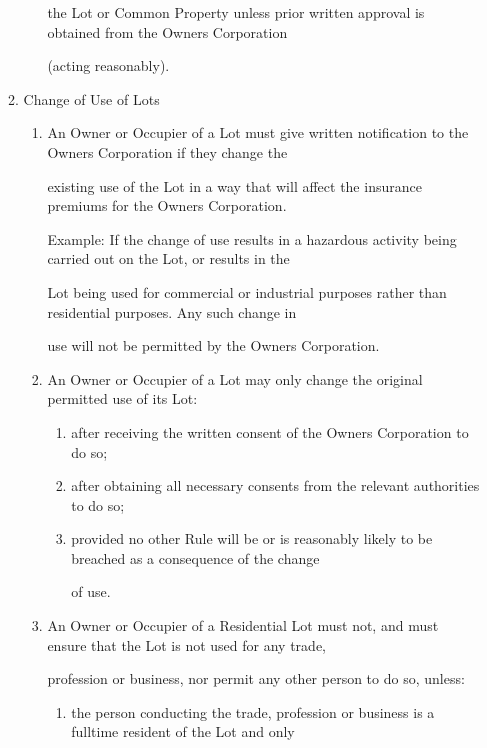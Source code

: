 \documentclass{article}
\begin{document}
\begin{enumerate}[label=\arabic*.]
\begin{enumerate}[label=\arabic{enumi}.\arabic*.]
\begin{enumerate}[label=(\arabic*)]
the Lot or Common Property unless prior written approval is obtained from the Owners Corporation 

(acting reasonably). 

\end{enumerate}
\item  Change of Use of Lots 

\begin{enumerate}[label=(\arabic*)]
\item  An Owner or Occupier of a Lot must give written notification to the Owners Corporation if they change the 

existing use of the Lot in a way that will affect the insurance premiums for the Owners Corporation. 

Example: If the change of use results in a hazardous activity being carried out on the Lot, or results in the 

Lot being used for commercial or industrial purposes rather than residential purposes. Any such change in 

use will not be permitted by the Owners Corporation. 

\item  An Owner or Occupier of a Lot may only change the original permitted use of its Lot: 

\begin{enumerate}[label=(\alph*)]
\item  after receiving the written consent of the Owners Corporation to do so; 

\item  after obtaining all necessary consents from the relevant authorities to do so; 

\item  provided no other Rule will be or is reasonably likely to be breached as a consequence of the change 

of use. 

\end{enumerate}
\item  An Owner or Occupier of a Residential Lot must not, and must ensure that the Lot is not used for any trade, 

profession or business, nor permit any other person to do so, unless: 

\begin{enumerate}[label=(\alph*)]
\item  the person conducting the trade, profession or business is a fulltime resident of the Lot and only 


\end{enumerate}
\end{enumerate}
\end{enumerate}
\end{enumerate}
\end{document}
